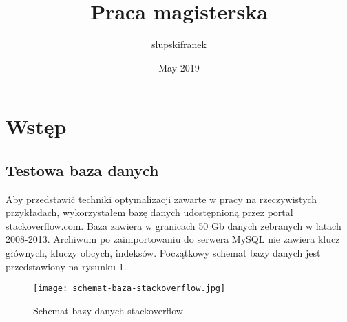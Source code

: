 \documentclass[12pt]{article}
\title{Praca magisterska}
\author{slupskifranek }
\date{May 2019}
\begin{document}
\maketitle


\section{Wstęp}

\subsection{Testowa baza danych}
Aby przedstawić techniki optymalizacji zawarte w pracy na rzeczywistych przykładach, wykorzystałem bazę danych udostępnioną przez portal stackoverflow.com. Baza zawiera w granicach 50 Gb danych zebranych w latach 2008-2013. Archiwum po zaimportowaniu do serwera MySQL nie zawiera klucz głównych, kluczy obcych, indeksów.
Początkowy schemat bazy danych jest przedstawiony na rysunku 1.
\begin{figure}
    \texttt{[image: schemat-baza-stackoverflow.jpg]} 
    \caption{Schemat bazy danych stackoverflow}
\end{figure}







\end{document}
